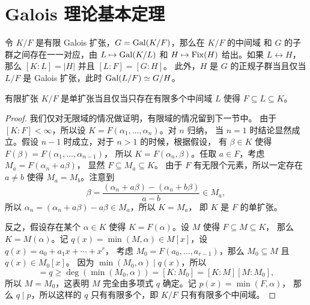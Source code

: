 \section{Galois 理论基本定理}

\begin{theorem}
  令 $K/F$ 是有限 Galois 扩张，$G=\operatorname{Gal}(K/F)$，那么在 $K/F$ 的中间域
  和 $G$ 的子群之间存在一一对应，由 $L\mapsto \operatorname{Gal}(K/L)$ 和 $H\mapsto\operatorname{Fix}(H)$
  给出。如果 $L\leftrightarrow H$，那么 $[K:L]=|H|$ 并且 $[L:F]=[G:H]$。
  此外，$H$ 是 $G$ 的正规子群当且仅当 $L/F$ 是 Galois 扩张，此时
  $\operatorname{Gal}(L/F)\simeq G/H$。
\end{theorem}

\begin{center}
\end{center}


\begin{theorem}[本原元定理]\label{thm:primitive element}
  有限扩张 $K/F$ 是单扩张当且仅当只存在有限多个中间域 $L$ 使得 $F\subseteq L\subseteq K$。
\end{theorem}
\begin{proof}
  我们仅对无限域的情况做证明，有限域的情况留到下一节中。
  由于 $[K:F]<\infty$，所以设 $K=F(\alpha_1,\dots,\alpha_n)$。对 $n$ 归纳，
  当 $n=1$ 时结论显然成立。假设 $n-1$ 时成立，对于 $n>1$ 的时候，根据假设，
  有 $\beta\in K$ 使得 $F(\beta)=F(\alpha_1,\dots,\alpha_{n-1})$，
  所以 $K=F(\alpha_n,\beta)$。任取 $a\in F$，考虑 $M_a=F(\alpha_n+a\beta)$，
  显然 $F\subseteq M_a\subseteq K$。
  由于 $F$ 有无限个元素，所以一定存在 $a\neq b$ 使得 $M_a=M_b$。注意到
  \[
    \beta=\frac{(\alpha_n+a\beta)-(\alpha_n+b\beta)}{a-b}\in M_a,
  \]
  所以 $\alpha_n=(\alpha_n+a\beta)-a\beta\in M_a$，所以 $K=M_a$，
  即 $K$ 是 $F$ 的单扩张。

  反之，假设存在某个 $\alpha\in K$ 使得 $K=F(\alpha)$。设 $M$ 使得 $F\subseteq M\subseteq K$，
  那么 $K=M(\alpha)$。记 $q(x)=\min(M,\alpha)\in M[x]$，设 $q(x)=a_0+a_1x+\cdots+x^r$，
  考虑 $M_0=F(a_0,\dots,a_{r-1})$，那么 $M_0\subseteq M$ 且 $q(x)\in M_0[x]$。
  因为 $\min(M_0,\alpha)\mid q(x)$，所以 
  \begin{equation*}
    [K:M]=q\geq \deg (\min(M_0,\alpha))=[K:M_0]=[K:M][M:M_0],
  \end{equation*}
  所以 $M=M_0$，这表明 $M$ 完全由多项式 $q$ 确定。记 $p(x)=\min(F,\alpha)$，
  那么 $q\mid p$，所以这样的 $q$ 只有有限多个，即 $K/F$ 只有有限多个中间域。
\end{proof}

